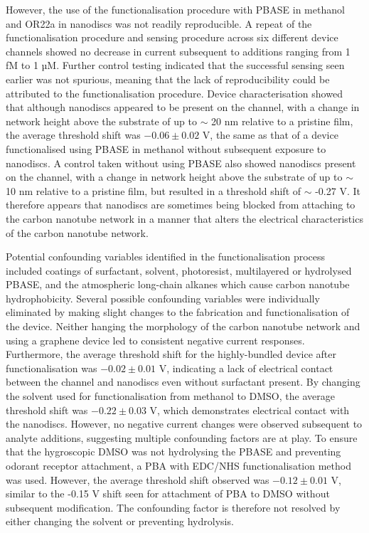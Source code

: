 \documentclass[
  a4paper,
]{scrbook}
\begin{document}
However, the use of the functionalisation procedure with PBASE in
methanol and OR22a in nanodiscs was not readily reproducible. A repeat
of the functionalisation procedure and sensing procedure across six
different device channels showed no decrease in current subsequent to
additions ranging from 1 fM to 1 µM. Further control testing indicated
that the successful sensing seen earlier was not spurious, meaning that
the lack of reproducibility could be attributed to the functionalisation
procedure. Device characterisation showed that although nanodiscs
appeared to be present on the channel, with a change in network height
above the substrate of up to \(\sim\) 20 nm relative to a pristine film,
the average threshold shift was \(-0.06\pm0.02\) V, the same as that of
a device functionalised using PBASE in methanol without subsequent
exposure to nanodiscs. A control taken without using PBASE also showed
nanodiscs present on the channel, with a change in network height above
the substrate of up to \(\sim\) 10 nm relative to a pristine film, but
resulted in a threshold shift of \(\sim\) -0.27 V. It therefore appears
that nanodiscs are sometimes being blocked from attaching to the carbon
nanotube network in a manner that alters the electrical characteristics
of the carbon nanotube network.

Potential confounding variables identified in the functionalisation
process included coatings of surfactant, solvent, photoresist,
multilayered or hydrolysed PBASE, and the atmospheric long-chain alkanes
which cause carbon nanotube hydrophobicity. Several possible confounding
variables were individually eliminated by making slight changes to the
fabrication and functionalisation of the device. Neither hanging the
morphology of the carbon nanotube network and using a graphene device
led to consistent negative current responses. Furthermore, the average
threshold shift for the highly-bundled device after functionalisation
was \(−0.02\pm0.01\) V, indicating a lack of electrical contact between
the channel and nanodiscs even without surfactant present. By changing
the solvent used for functionalisation from methanol to DMSO, the
average threshold shift was \(−0.22\pm0.03\) V, which demonstrates
electrical contact with the nanodiscs. However, no negative current
changes were observed subsequent to analyte additions, suggesting
multiple confounding factors are at play. To ensure that the hygroscopic
DMSO was not hydrolysing the PBASE and preventing odorant receptor
attachment, a PBA with EDC/NHS functionalisation method was used.
However, the average threshold shift observed was \(-0.12\pm0.01\) V,
similar to the -0.15 V shift seen for attachment of PBA to DMSO without
subsequent modification. The confounding factor is therefore not
resolved by either changing the solvent or preventing hydrolysis.
\end{document}
